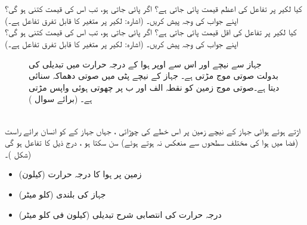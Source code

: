 \\
\\
کیا لکیر  پر تفاعل  کی   اعظم  قیمت پائی جاتی ہے؟ اگر   پائی جاتی ہو، تب اس کی قیمت کتنی ہو گی؟ اپنے جواب کی وجہ پیش کریں۔ (اشارہ: لکیر پر  متغیر  کا قابل تفرق تفاعل ہے۔)
\\
کیا لکیر  پر تفاعل  کی  اقل قیمت پائی جاتی ہے؟ اگر پائی جاتی   ہو، تب اس کی قیمت کتنی ہو گی؟ اپنے جواب کی وجہ پیش کریں۔ (اشارہ: لکیر پر  متغیر  کا قابل تفرق تفاعل ہے۔)
\begin{figure}
\centering
{}
\caption
{جہاز سے نیچے اور اس سے اوپر ہوا کے درجہ حرارت  میں تبدیلی کی بدولت  صوتی موج مڑتی ہے۔ جہاز کے نیچے پٹی  میں صوتی دھماکہ سنائی دیتا ہے۔صوتی موج زمین کو نقطہ الف اور ب پر  چھوتی ہوئی واپس مڑتی ہے۔ (برائے سوال )}
\label{شکل_صوتی_دھماکہ}
\end{figure}
\\
اڑتے ہوئے ہوائی  جہاز کے نیچے زمین پر اس خطے کی چوڑائی ،   جہاں  جہاز کے کو انسان  برائے راست (فضا میں ہوا کی مختلف  سطحوں سے منعکس نہ ہوتے ہوئے)  سن سکتا ہو  ، درج ذیل کا  تفاعل ہو گی (شکل )۔
\begin{itemize}
\item
{} زمین پر ہوا کا   درجہ حرارت (کیلون) 
\item
{} جہاز کی بلندی (کلو میٹر)
\item
{}  درجہ حرارت کی انتصابی  شرح تبدیلی (کیلون فی کلو میٹر)
\end{itemize}
